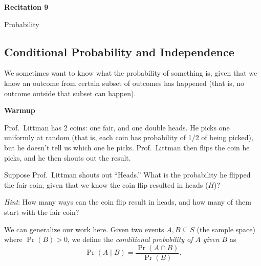 \documentclass[12pt,letterpaper]{article}
\newif\ifsol
\newcommand{\solu}[2]{ \begin{mdframed} \ifsol #2 \else \vspace{#1} \fi \end{mdframed} }
\begin{document}
  \thispagestyle{firstpagestyle}
  \begin{center}
    {\large \textbf{Recitation 9}}
    
    {\large Probability}

  \end{center}

\subsection*{Conditional Probability and Independence}

We sometimes want to know what the probability of something is, given that we know an outcome from certain subset of outcomes has happened (that is, no outcome outside that subset can happen).

\textbf{Warmup}

Prof.\ Littman has 2 coins: one fair, and one double heads. He picks one uniformly at random (that is, each coin has probability of 1/2 of being picked), but he doesn't tell us which one he picks. Prof.\ Littman then flips the coin he picks, and he then shouts out the result.

Suppose Prof.\ Littman shouts out ``Heads.'' What is the probability he flipped the fair coin, given that we know the coin flip resulted in heads ($H$)?

\textit{Hint}: How many ways can the coin flip result in heads, and how many of them start with the fair coin?
\begin{mdframed} \vspace{1cm} \end{mdframed}

We can generalize our work here. Given two events $A,B \subseteq S$ (the sample space) where $\Pr(B) > 0$, we define the \textit{conditional probability of $A$ given $B$} as $$
\Pr(A\mid B) = \frac{\Pr(A \cap B)}{\Pr(B)}.
$$





\end{document}
